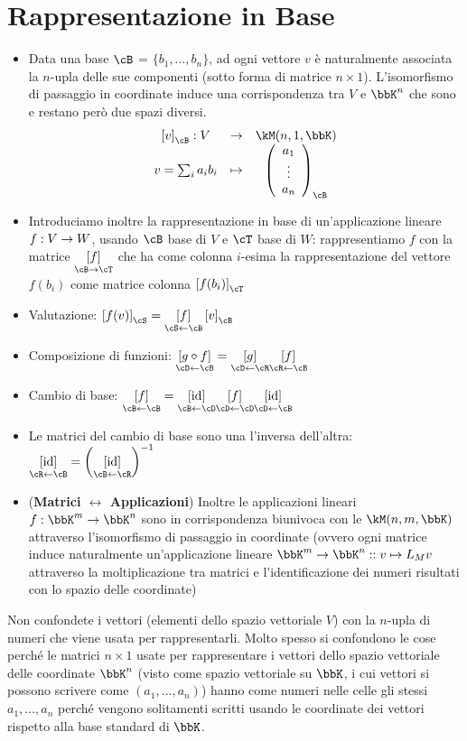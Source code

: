 \documentclass[a4paper,NoNotes,GeneralMath]{stdmdoc}
\newcommand{\mtrvec}[2]{\left[ {#1} \right]_{#2}}
\newcommand{\mtrapp}[3]{\underset{ {{#2} \rar {#3}} }{ \left[ {#1} \right]}}
\newcommand{\revmtrapp}[3]{\underset{ {{#3} \leftarrow {#2}} }{ \left[ {#1} \right]}}
\begin{document}
	\section*{Rappresentazione in Base}
	\begin{itemize}
		\item Data una base $\cB$ = $\{b_1, \ldots, b_n\}$, ad ogni vettore $v$ è naturalmente associata la $n$-upla delle sue componenti (sotto forma di matrice $n\times 1$). L'isomorfismo di passaggio in coordinate induce una corrispondenza tra $V$ e $\bbK^n$ che sono e restano però due spazi diversi. \\ $$ \begin{array}{ccc} \mtrvec{v}{\cB}: V & \rar & \kM(n, 1, \bbK) \\ v = \sum_{i} a_i b_i & \mapsto & \left( \begin{array}{c} a_1 \\ \vdots \\ a_n \end{array} \right)_{\cB} \end{array} $$
		\item Introduciamo inoltre la rappresentazione in base di un'applicazione lineare $f: V \rightarrow W$, usando $\cB$ base di $V$ e $\cT$ base di $W$: rappresentiamo $f$ con la matrice $\mtrapp{f}{\cB}{\cT}$ che ha come colonna $i$-esima la rappresentazione del vettore $f(b_i)$ come matrice colonna $\mtrvec{f(b_i)}{\cT}$
		\item Valutazione: $\mtrvec{f(v)}{\cS} = \revmtrapp{f}{\cB}{\cS} \mtrvec{v}{\cB}$
		\item Composizione di funzioni: $\revmtrapp{g\circ f}{\cB}{\cD} = \revmtrapp{g}{\cR}{\cD} \revmtrapp{f}{\cB}{\cR}$
		\item Cambio di base: $\revmtrapp{f}{\cB}{\cB} = \revmtrapp{\Id}{\cD}{\cB} \revmtrapp{f}{\cD}{\cD} \revmtrapp{\Id}{\cB}{\cD}$
		\item Le matrici del cambio di base sono una l'inversa dell'altra: $\revmtrapp{\Id}{\cB}{\cR} = \left(\revmtrapp{\Id}{\cR}{\cB}\right) ^ {-1}$
		\item ({\bf Matrici $\leftrightarrow$ Applicazioni}) Inoltre le applicazioni lineari $f: \bbK^m \rar \bbK^n$ sono in corrispondenza biunivoca con le $\kM(n, m, \bbK)$ attraverso l'isomorfismo di passaggio in coordinate (ovvero ogni matrice induce naturalmente un'applicazione lineare $\bbK^m \rar \bbK^n :: v \mapsto L_M v$ attraverso la moltiplicazione tra matrici e l'identificazione dei numeri risultati con lo spazio delle coordinate)
	\end{itemize}
	\Achtung Non confondete i vettori (elementi dello spazio vettoriale $V$) con la $n$-upla di numeri che viene usata per rappresentarli. Molto spesso si confondono le cose perché le matrici $n\times 1$ usate per rappresentare i vettori dello spazio vettoriale delle coordinate $\bbK^n$ (visto come spazio vettoriale su $\bbK$, i cui vettori si possono scrivere come $(a_1, \ldots, a_n)$) hanno come numeri nelle celle gli stessi $a_1, \ldots, a_n$ perché vengono solitamenti scritti usando le coordinate dei vettori rispetto alla base standard di $\bbK$.
\end{document}
